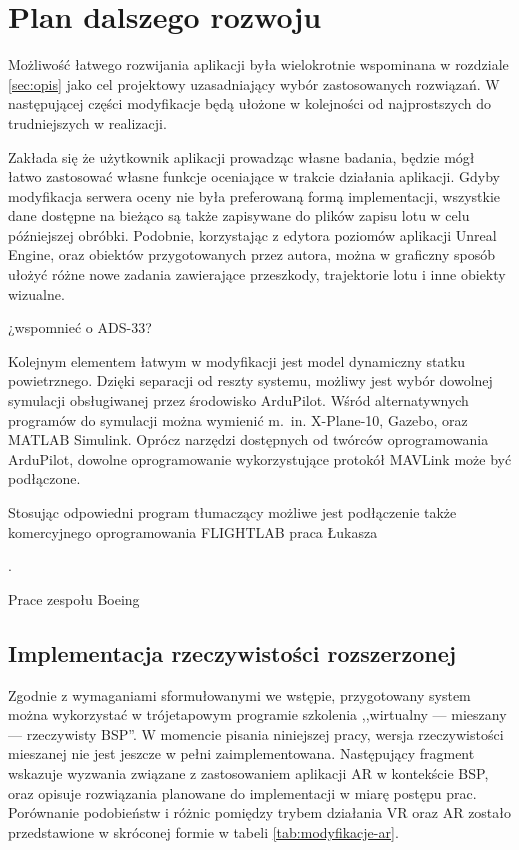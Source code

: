 \newpage
\section{Plan dalszego rozwoju}
Możliwość łatwego rozwijania aplikacji była wielokrotnie wspominana w rozdziale \ref{sec:opis} jako cel projektowy uzasadniający wybór zastosowanych rozwiązań. W następującej części modyfikacje będą ułożone w kolejności od najprostszych do trudniejszych w realizacji.

Zakłada się że użytkownik aplikacji prowadząc własne badania, będzie mógł łatwo zastosować własne funkcje oceniające w trakcie działania aplikacji. Gdyby modyfikacja serwera oceny nie była preferowaną formą implementacji, wszystkie dane dostępne na bieżąco są także zapisywane do plików zapisu lotu w celu późniejszej obróbki. Podobnie, korzystając z edytora poziomów aplikacji Unreal Engine, oraz obiektów przygotowanych przez autora, można w graficzny sposób ułożyć różne nowe zadania zawierające przeszkody, trajektorie lotu i inne obiekty wizualne. \begin{todo}¿wspomnieć o ADS-33?\end{todo}

Kolejnym elementem łatwym w modyfikacji jest model dynamiczny statku powietrznego. Dzięki separacji od reszty systemu, możliwy jest wybór dowolnej symulacji obsługiwanej przez środowisko ArduPilot. Wśród alternatywnych programów do symulacji można wymienić m.~in. X-Plane-10, Gazebo, oraz MATLAB Simulink. Oprócz narzędzi dostępnych od twórców oprogramowania ArduPilot, dowolne oprogramowanie wykorzystujące protokół MAVLink może być podłączone. \begin{todo}Stosując odpowiedni program tłumaczący możliwe jest podłączenie także komercyjnego oprogramowania FLIGHTLAB praca Łukasza\end{todo}.

\begin{todo}
    Prace zespołu Boeing
\end{todo}

\subsection{Implementacja rzeczywistości rozszerzonej}
Zgodnie z wymaganiami sformułowanymi we wstępie, przygotowany system można wykorzystać w trójetapowym programie szkolenia ,,wirtualny --- mieszany --- rzeczywisty BSP''. W momencie pisania niniejszej pracy, wersja rzeczywistości mieszanej nie jest jeszcze w pełni zaimplementowana. Następujący fragment wskazuje wyzwania związane z zastosowaniem aplikacji AR w kontekście BSP, oraz opisuje rozwiązania planowane do implementacji w miarę postępu prac. Porównanie podobieństw i różnic pomiędzy trybem działania VR oraz AR zostało przedstawione w skróconej formie w tabeli \ref{tab:modyfikacje-ar}.

